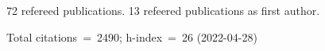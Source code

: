 72 refereed publications. 13 refeered publications as first author.

Total citations~=~2490; h-index~=~26 (2022-04-28)